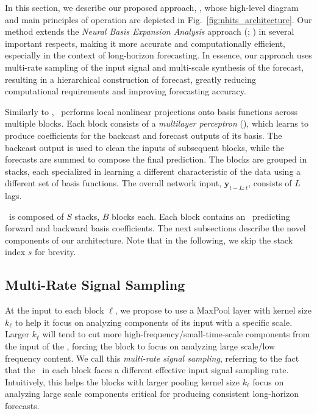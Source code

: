 In this section, we describe our proposed approach, \ours, whose high-level diagram and main principles of operation are depicted in Fig.~\ref{fig:nhits_architecture}. Our method extends the \emph{Neural Basis Expansion Analysis} approach (\NBEATS; \citealt{oreshkin2020nbeats}) in several important respects, making it more accurate and computationally efficient, especially in the context of long-horizon forecasting. In essence, our approach uses multi-rate sampling of the input signal and multi-scale synthesis of the forecast, resulting in a hierarchical construction of forecast, greatly reducing computational requirements and improving forecasting accuracy. 

Similarly to \NBEATS, \ours\ performs local nonlinear projections onto basis functions across multiple blocks. Each block consists of a \emph{multilayer perceptron} (\MLP), which learns to produce coefficients for the backcast and forecast outputs of its basis. The backcast output is used to clean the inputs of subsequent blocks, while the forecasts are summed to compose the final prediction. The blocks are grouped in stacks, each specialized in learning a different characteristic of the data using a different set of basis functions. The overall network input, $\mathbf{y}_{t-L:t}$, consists of $L$ lags. %

\ours\ is composed of $S$ stacks, $B$ blocks each. Each block contains an \MLP\ predicting forward and backward basis coefficients. The next subsections describe the novel components of our architecture. Note that in the following, we skip the stack index $s$ for brevity.

\subsection{Multi-Rate Signal Sampling}
\label{section:multirate_sampling}
At the input to each block $\ell$, we propose to use a MaxPool layer with kernel size $k_{\ell}$ to help it focus on analyzing components of its input with a specific scale. Larger $k_{\ell}$ will tend to cut more high-frequency/small-time-scale components from the input of the \MLP, forcing the block to focus on analyzing large scale/low frequency content. We call this \emph{multi-rate signal sampling}, referring to the fact that the \MLP\ in each block faces a different effective input signal sampling rate. Intuitively, this helps the blocks with larger pooling kernel size $k_{\ell}$ focus on analyzing large scale components critical for producing consistent long-horizon forecasts. 

